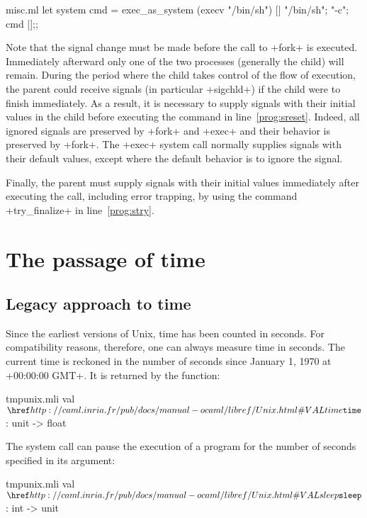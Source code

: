 \begin{example}
\begin{listingcodefile}[style=numbers]{misc.ml}
let system cmd = 
  exec_as_system (execv "/bin/sh") [| "/bin/sh"; "-c"; cmd |];;
\end{listingcodefile}
%

Note that the signal change must be made before the call to \ml+fork+ is
executed.  Immediately afterward only one of the two processes
(generally the child) will remain.  During the period where the child
takes control of the flow of execution, the parent could receive signals
(in particular \ml+sigchld+) if the child were to finish immediately.  As a
result, it is necessary to supply signals with their initial values in
the child before executing the command in line~\ref{prog:sreset}.
Indeed, all ignored signals are preserved by \ml+fork+ and \ml+exec+
and their behavior is preserved by \ml+fork+.  The
\ml+exec+ system call normally supplies signals with their default values, except
where the default behavior is to ignore the
signal.

Finally, the parent must supply signals with their initial values
immediately after executing the call, including error trapping, by 
using the command \ml+try_finalize+ in line~\ref{prog:stry}.
\end{example}


\section{The passage of time}

\subsection*{Legacy approach to time}

Since the earliest versions of Unix, time has been counted in seconds.
For compatibility reasons, therefore, one can always measure time in seconds.
The current time is reckoned in the number of seconds since January 1, 1970
at \ml+00:00:00 GMT+.  It is returned by the function:

%
\begin{listingcodefile}{tmpunix.mli}
val $\indexlibvalue{Unix}{time}$ : unit -> float
\end{listingcodefile}
%

The  system call can pause the execution of a program
for the number of seconds specified in its argument:
%
\begin{listingcodefile}{tmpunix.mli}
val $\libvalue{Unix}{sleep}$ : int -> unit
\end{listingcodefile}
%

